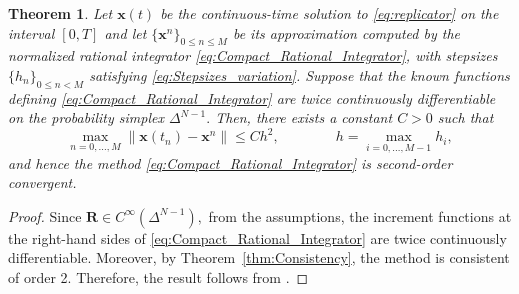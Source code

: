 \documentclass[11pt,letterpaper]{article}
\newtheorem{theorem}{Theorem}[section]
\theoremstyle{remark}
\begin{document}
\begin{theorem}\label{thm:Convergence}
    Let $\bm{x}(t)$ be the continuous-time solution to \eqref{eq:replicator} on the interval $[0,T]$ and let $\{\bm{x}^n\}_{0\leq n \leq M}$ be its approximation computed by the normalized rational integrator \eqref{eq:Compact_Rational_Integrator}, with stepsizes $\{h_n\}_{0\leq n < M}$ satisfying \eqref{eq:Stepsizes_variation}. Suppose that the known functions defining \eqref{eq:Compact_Rational_Integrator} are twice continuously differentiable on the probability simplex $\Delta^{N-1}.$ Then, there exists a constant $C>0$ such that
    \begin{equation*}
        \max_{n=0,\dots,M}\|\bm{x}(t_n)-\bm{x}^n\|\leq C h^2,  \qquad \qquad h=\max_{i=0,\dots,M-1} h_i,
    \end{equation*}
    and hence the method \eqref{eq:Compact_Rational_Integrator} is second-order convergent.
\end{theorem}
\begin{proof}
    Since $\bm{R}\in C^\infty(\Delta^{N-1}),$ from the assumptions, the increment functions at the right-hand sides of \eqref{eq:Compact_Rational_Integrator} are twice continuously differentiable. Moreover, by Theorem~\ref{thm:Consistency}, the method is consistent of order 2. Therefore, the result follows from \cite[Theorem 3.6.]{Hairer}.
\end{proof}
\end{document}
